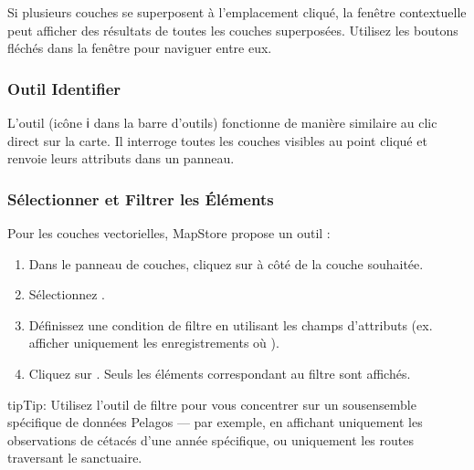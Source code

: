 \documentclass[letterpaper,10pt,english]{sphinxmanual}
\begin{document}
\sphinxAtStartPar
Si plusieurs couches se superposent à l’emplacement cliqué, la fenêtre contextuelle
peut afficher des résultats de toutes les couches superposées. Utilisez les boutons
fléchés dans la fenêtre pour naviguer entre eux.


\subsubsection{Outil Identifier}
\label{\detokenize{fr/04_explorer_cartes:outil-identifier}}
\sphinxAtStartPar
L’outil  (icône ℹ️ dans la barre d’outils) fonctionne de manière
similaire au clic direct sur la carte. Il interroge toutes les couches visibles au
point cliqué et renvoie leurs attributs dans un panneau.


\subsubsection{Sélectionner et Filtrer les Éléments}
\label{\detokenize{fr/04_explorer_cartes:selectionner-et-filtrer-les-elements}}
\sphinxAtStartPar
Pour les couches vectorielles, MapStore propose un outil  :
\begin{enumerate}
%
\item {} 
\sphinxAtStartPar
Dans le panneau de couches, cliquez sur  à côté de la couche souhaitée.

\item {} 
\sphinxAtStartPar
Sélectionnez .

\item {} 
\sphinxAtStartPar
Définissez une condition de filtre en utilisant les champs d’attributs
(ex. afficher uniquement les enregistrements où ).

\item {} 
\sphinxAtStartPar
Cliquez sur . Seuls les éléments correspondant au filtre sont affichés.

\end{enumerate}

\begin{sphinxadmonition}{tip}{Tip:}
\sphinxAtStartPar
Utilisez l’outil de filtre pour vous concentrer sur un sous\sphinxhyphen{}ensemble spécifique de
données Pelagos — par exemple, en affichant uniquement les observations de cétacés
d’une année spécifique, ou uniquement les routes traversant le sanctuaire.
\end{sphinxadmonition}
\end{document}
